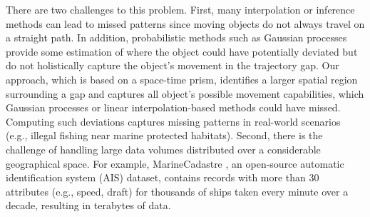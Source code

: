 \documentclass[acmsmall]{acmart}
\begin{document}
There are two challenges to this problem. First, many interpolation or inference methods can lead to missed patterns since moving objects do not always travel on a straight path. In addition, probabilistic methods such as Gaussian processes provide some estimation of where the object could have potentially deviated but do not holistically capture the object's movement in the trajectory gap. Our approach, which is based on a space-time prism, identifies a larger spatial region surrounding a gap and captures all object's possible movement capabilities, which Gaussian processes or linear interpolation-based methods could have missed. Computing such deviations captures missing patterns in real-world scenarios (e.g., illegal fishing near marine protected habitats). Second, there is the challenge of handling large data volumes distributed over a considerable geographical space. For example, MarineCadastre \cite{aisdataUS}, an open-source automatic identification system (AIS) dataset, contains records with more than 30 attributes (e.g., speed, draft) for thousands of ships taken every minute over a decade, resulting in terabytes of data.
\end{document}

